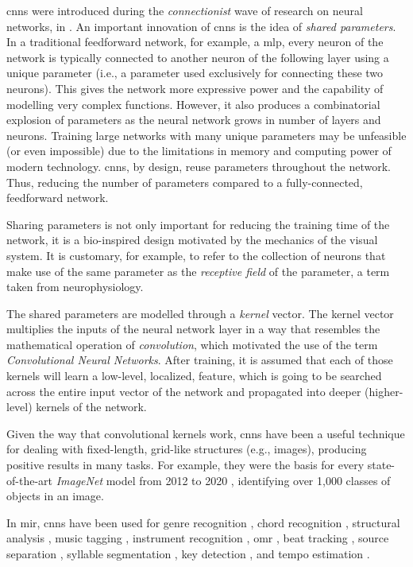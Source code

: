 

\glspl{cnn} were introduced during the \emph{connectionist}
wave of research on neural networks, in
\textcite{lecun1989generalization, lecun1989handwritten}. An
important innovation of \glspl{cnn} is the idea of
\emph{shared parameters}. In a traditional feedforward
network, for example, a \gls{mlp}, every neuron of the
network is typically connected to another neuron of the
following layer using a unique parameter (i.e., a parameter
used exclusively for connecting these two neurons). This
gives the network more expressive power and the capability
of modelling very complex functions. However, it also
produces a combinatorial explosion of parameters as the
neural network grows in number of layers and neurons.
Training large networks with many unique parameters may be
unfeasible (or even impossible) due to the limitations in
memory and computing power of modern technology.
\glspl{cnn}, by design, reuse parameters throughout the
network. Thus, reducing the number of parameters compared to
a fully-connected, feedforward network.

Sharing parameters is not only important for reducing the
training time of the network, it is a bio-inspired design
motivated by the mechanics of the visual system. It is
customary, for example, to refer to the collection of
neurons that make use of the same parameter as the
\emph{receptive field} of the parameter, a term taken from
neurophysiology.

The shared parameters are modelled through a \emph{kernel}
vector. The kernel vector multiplies the inputs of the
neural network layer in a way that resembles the
mathematical operation of \emph{convolution}, which
motivated the use of the term \emph{Convolutional Neural
Networks}. After training, it is assumed that each of those
kernels will learn a low-level, localized, feature, which is
going to be searched across the entire input vector of the
network and propagated into deeper (higher-level) kernels of
the network.

Given the way that convolutional kernels work, \glspl{cnn}
have been a useful technique for dealing with fixed-length,
grid-like structures (e.g., images), producing positive
results in many tasks. For example, they were the basis for
every state-of-the-art \emph{ImageNet} model from 2012 to
2020 \parencite{krizhevsky2012imagenet}, identifying over
1,000 classes of objects in an image.

In \gls{mir}, \glspl{cnn} have been used for genre
recognition \parencite{dieleman2011audiobased}, chord
recognition \parencite{humphrey2012rethinking}, structural
analysis \parencite{ullrich2014boundary, grill2015music},
music tagging \parencite{choi2016automatic}, instrument
recognition \parencite{lostanlen2016deep}, \gls{omr}
\parencite{calvozaragoza2017endend, pacha2018optical}, beat
tracking \parencite{gkiokas2017convolutional}, source
separation \parencite{miron2017monaural}, syllable
segmentation \parencite{pons2017scoreinformed}, key
detection \parencite{korzeniowski2018genreagnostic}, and
tempo estimation \parencite{schreiber2018singlestep,
schreiber2019musical}.
